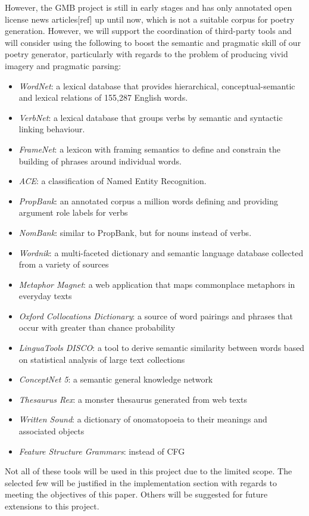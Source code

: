 However, the GMB project is still in early stages and has only annotated open license news articles[ref] up until now, which is not a suitable corpus for poetry generation. However, we will support the coordination of third-party tools and will consider using the following to boost the semantic and pragmatic skill of our poetry generator, particularly with regards to the problem of producing vivid imagery and pragmatic parsing:
\begin{itemize}
\item{\textit{WordNet}: a lexical database that provides hierarchical, conceptual-semantic and lexical relations of 155,287 English words.}
\item{\textit{VerbNet}: a lexical database that groups verbs by semantic and syntactic linking behaviour.}
\item{\textit{FrameNet}: a lexicon with framing semantics to define and constrain the building of phrases around individual words.}
\item{\textit{ACE}: a classification of Named Entity Recognition.}
\item{\textit{PropBank}: an annotated corpus a million words defining and providing argument role labels for verbs}
\item{\textit{NomBank}: similar to PropBank, but for nouns instead of verbs.}
\item{\textit{Wordnik}: a multi-faceted dictionary and semantic language database collected from a variety of sources}
\item{\textit{Metaphor Magnet}: a web application that maps commonplace metaphors in everyday texts}
\item{\textit{Oxford Collocations Dictionary}: a source of word pairings and phrases that occur with greater than chance probability}
\item{\textit{LinguaTools DISCO}: a tool to derive semantic similarity between words based on statistical analysis of large text collections}
\item{\textit{ConceptNet 5}: a semantic general knowledge network}
\item{\textit{Thesaurus Rex}: a monster thesaurus generated from web texts}
\item{\textit{Written Sound}: a dictionary of onomatopoeia to their meanings and associated objects}
\item{\textit{Feature Structure Grammars}: instead of CFG}
\end{itemize}

Not all of these tools will be used in this project due to the limited scope. The selected few will be justified in the implementation section with regards to meeting the objectives of this paper. Others will be suggested for future extensions to this project.

